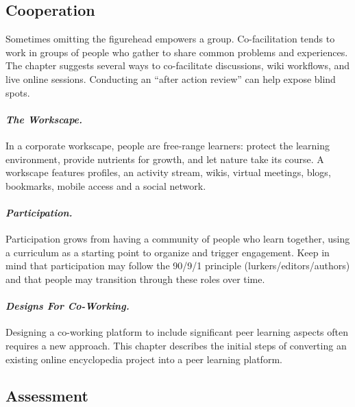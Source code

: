 \hypertarget{cooperation}{%
\subsection{Cooperation}\label{cooperation}}

Sometimes omitting the figurehead empowers a group. Co-facilitation
tends to work in groups of people who gather to share common problems
and experiences. The chapter suggests several ways to co-facilitate
discussions, wiki workflows, and live online sessions. Conducting an
``after action review'' can help expose blind spots.

\hypertarget{the-workscape.}{%
\paragraph{\texorpdfstring{\emph{The
Workscape.}}{The Workscape.}}\label{the-workscape.}}

In a corporate workscape, people are free-range learners: protect the
learning environment, provide nutrients for growth, and let nature take
its course. A workscape features profiles, an activity stream, wikis,
virtual meetings, blogs, bookmarks, mobile access and a social network.

\hypertarget{participation.}{%
\paragraph{\texorpdfstring{\emph{Participation.}}{Participation.}}\label{participation.}}

Participation grows from having a community of people who learn
together, using a curriculum as a starting point to organize and trigger
engagement. Keep in mind that participation may follow the 90/9/1
principle (lurkers/editors/authors) and that people may transition
through these roles over time.

\hypertarget{designs-for-co-working.}{%
\paragraph{\texorpdfstring{\emph{Designs For
Co-Working.}}{Designs For Co-Working.}}\label{designs-for-co-working.}}

Designing a co-working platform to include significant peer learning
aspects often requires a new approach. This chapter describes the
initial steps of converting an existing online encyclopedia project into
a peer learning platform.

\hypertarget{assessment}{%
\subsection{Assessment}\label{assessment}}

